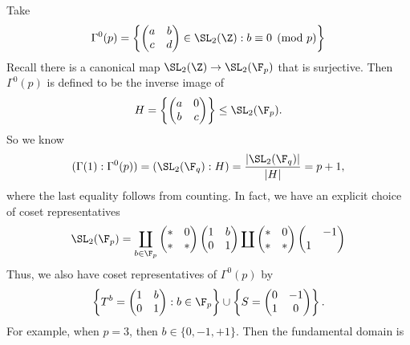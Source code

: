 \documentclass[a4paper]{article}
\begin{document}
\begin{eg}
  Take
  \[
    \Gamma^0(p) = \left\{
      \begin{pmatrix}
        a & b\\
        c & d
      \end{pmatrix} \in \SL_2(\Z) : b \equiv 0 \pmod p
    \right\}
  \]
  Recall there is a canonical map $\SL_2(\Z) \to \SL_2(\F_p)$ that is surjective. Then $\Gamma^0(p)$ is defined to be the inverse image of
  \[
    H =
    \left\{
      \begin{pmatrix}
        a & 0\\
        b & c
      \end{pmatrix}
    \right\} \leq \SL_2(\F_p).
  \]
  So we know
  \[
    (\Gamma(1) : \Gamma^0(p)) = (\SL_2(\F_q): H) = \frac{|\SL_2(\F_q)|}{|H|} = p + 1,
  \]
  where the last equality follows from counting. In fact, we have an explicit choice of coset representatives
  \[
    \SL_2(\F_p) = \coprod_{b \in \F_p}
    \begin{pmatrix}
      * & 0\\
      * & *
    \end{pmatrix}
    \begin{pmatrix}
      1 & b\\
      0 & 1
    \end{pmatrix}
    \coprod
    \begin{pmatrix}
      * & 0\\
      * & *
    \end{pmatrix}
    \begin{pmatrix}
      & -1\\
      1 &
    \end{pmatrix}
  \]
  Thus, we also have coset representatives of $\Gamma^0(p)$ by
  \[
    \left\{
      T^b =
      \begin{pmatrix}
        1 & b\\
        0 & 1
      \end{pmatrix}
    : b \in \F_p\right\} \cup \left\{
      S =
      \begin{pmatrix}
        0 & -1\\
        1 & 0
      \end{pmatrix}
    \right\}.
  \]
  For example, when $p = 3$, then $b \in \{0, -1, +1\}$. Then the fundamental domain is
  \begin{center}
\end{center}
\end{eg}
\end{document}
